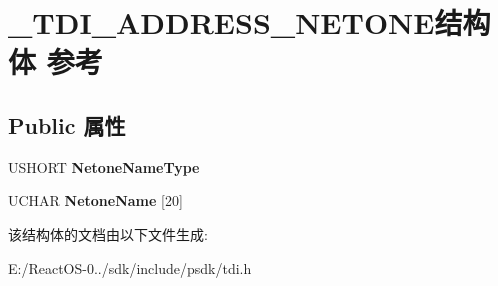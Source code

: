 \hypertarget{struct___t_d_i___a_d_d_r_e_s_s___n_e_t_o_n_e}{}\section{\+\_\+\+T\+D\+I\+\_\+\+A\+D\+D\+R\+E\+S\+S\+\_\+\+N\+E\+T\+O\+N\+E结构体 参考}
\label{struct___t_d_i___a_d_d_r_e_s_s___n_e_t_o_n_e}
\subsection*{Public 属性}
\begin{DoxyCompactItemize}
\item 
\mbox{\label{struct___t_d_i___a_d_d_r_e_s_s___n_e_t_o_n_e_adc622124400da5907edaba9f89b4654e}} 
U\+S\+H\+O\+RT {\bfseries Netone\+Name\+Type}
\item 
\mbox{\label{struct___t_d_i___a_d_d_r_e_s_s___n_e_t_o_n_e_accff41b71ad44f736c45fe2fe597aea0}} 
U\+C\+H\+AR {\bfseries Netone\+Name} \mbox{[}20\mbox{]}
\end{DoxyCompactItemize}


该结构体的文档由以下文件生成\+:\begin{DoxyCompactItemize}
\item 
E\+:/\+React\+O\+S-\/0../sdk/include/psdk/tdi.\+h\end{DoxyCompactItemize}
